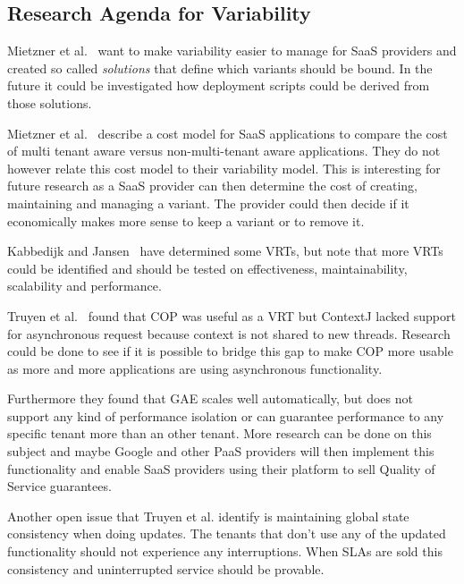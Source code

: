 \subsection{Research Agenda for Variability}

Mietzner et al.~\cite{mietzner2008defining} want to make variability easier to manage for \ac{SaaS} providers and created so called \textit{solutions} that define which variants should be bound. In the future it could be investigated how deployment scripts could be derived from those solutions.

Mietzner et al.~\cite{mietzner2009variability} describe a cost model for \ac{SaaS} applications to compare the cost of multi tenant aware versus non-multi-tenant aware applications. They do not however relate this cost model to their variability model. This is interesting for future research as a \ac{SaaS} provider can then determine the cost of creating, maintaining and managing a variant. The provider could then decide if it economically makes more sense to keep a variant or to remove it.


Kabbedijk and Jansen~\cite{kabbedijk2011variability} have determined some \acp{VRT}, but note that more \acp{VRT} could be identified and should be tested on effectiveness, maintainability, scalability and performance.

Truyen et al.~\cite{truyen2012context} found that \ac{COP} was useful as a \ac{VRT} but ContextJ lacked support for asynchronous request because context is not shared to new threads. Research could be done to see if it is possible to bridge this gap to make \ac{COP} more usable as more and more applications are using asynchronous functionality.

Furthermore they found that \ac{GAE} scales well automatically, but does not support any kind of performance isolation or can guarantee performance to any specific tenant more than an other tenant. More research can be done on this subject and maybe Google and other \ac{PaaS} providers will then implement this functionality and enable \ac{SaaS} providers using their platform to sell Quality of Service guarantees.

Another open issue that Truyen et al. identify is maintaining global state consistency when doing updates. The tenants that don't use any of the updated functionality should not experience any interruptions. When \acp{SLA} are sold this consistency and uninterrupted service should be provable.

